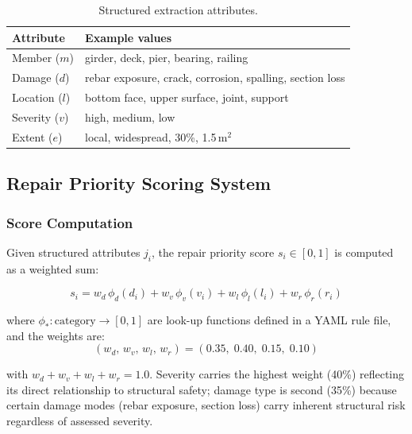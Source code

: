 \documentclass[twocolumn]{article}
\begin{document}
\begin{table}[h]
\centering
\caption{Structured extraction attributes.}
\label{tab:extract_fields}
\setlength{\tabcolsep}{3pt}
\begin{tabular}{lp{4.0cm}}
\toprule
\textbf{Attribute} & \textbf{Example values} \\
\midrule
Member ($m$)   & girder, deck, pier, bearing, railing \\
Damage ($d$)   & rebar exposure, crack, corrosion, spalling, section loss \\
Location ($l$) & bottom face, upper surface, joint, support \\
Severity ($v$) & high, medium, low \\
Extent ($e$)   & local, widespread, 30\%, 1.5\,m$^2$ \\
\bottomrule
\end{tabular}
\end{table}

\subsection{Repair Priority Scoring System}
\label{sec:scoring}

\subsubsection{Score Computation}

Given structured attributes $j_i$, the repair priority score
$s_i \in [0, 1]$ is computed as a weighted sum:

\begin{equation}
  s_i = w_d\,\phi_d(d_i) + w_v\,\phi_v(v_i) + w_l\,\phi_l(l_i) + w_r\,\phi_r(r_i)
  \label{eq:score}
\end{equation}

where $\phi_*: \text{category} \to [0,1]$ are look-up functions defined in
a YAML rule file, and the weights are:
\begin{equation}
  (w_d,\, w_v,\, w_l,\, w_r) = (0.35,\; 0.40,\; 0.15,\; 0.10)
  \label{eq:weights}
\end{equation}

with $w_d + w_v + w_l + w_r = 1.0$.
Severity carries the highest weight (40\%) reflecting its direct relationship
to structural safety; damage type is second (35\%) because certain damage modes
(rebar exposure, section loss) carry inherent structural risk regardless of
assessed severity.
\end{document}
